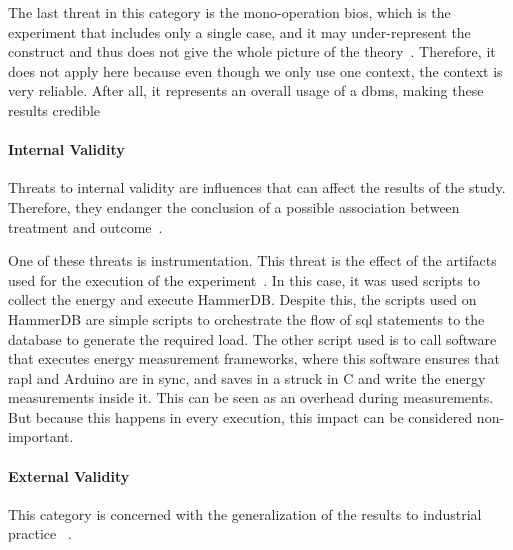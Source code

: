 
The last threat in this category is the mono-operation bios, which is the experiment that includes only a single case, and it may under-represent the construct and thus does not give the whole picture of the theory~\cite{10.5555/2349018}.
Therefore, it does not apply here because even though we only use one context, the context is very reliable. After all, it represents an overall usage of a \gls{dbms}, making these results credible



\paragraph{Internal Validity}


Threats to internal validity are influences that can affect the results of the study. Therefore, they endanger the conclusion of a possible association between treatment and outcome~\cite{10.5555/2349018}.


One of these threats is instrumentation. This threat is the effect of the artifacts used for the execution of the experiment~\cite{10.5555/2349018}. In this case, it was used scripts to collect the energy and execute HammerDB. Despite this, the scripts used on HammerDB are simple scripts to orchestrate the flow of \gls{sql} statements to the database to generate the required load. The other script used is to call software that executes energy measurement frameworks, where this software ensures that \gls{rapl} and Arduino are in sync, and saves in a struck in C and write the energy measurements inside it.  This can be seen as an overhead during measurements. But because this happens in every execution, this impact can be considered non-important. 

\paragraph{External Validity}


This category is concerned with the generalization of the results to industrial practice ~\cite{10.5555/2349018}.




